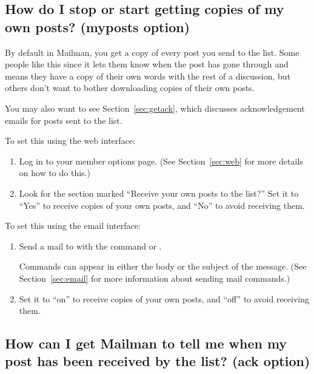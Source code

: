 \documentclass{howto}
\begin{document}
\subsection{How do I stop or start getting copies of my own posts? (myposts
	option)\label{sec:getown}}
By default in Mailman, you get a copy of every post you send to the list.  
Some people like this since it lets them know when the post has gone through
and means they have a copy of their own words with the rest of a discussion, 
but others don't want to bother downloading copies of their own posts.


You may also want to see Section~\ref{sec:getack}, which discusses 
acknowledgement emails for posts sent to the list.

To set this using the web interface:
\begin{enumerate}
	\item Log in to your member options page.  (See Section~\ref{sec:web} 
	for more details on how to do this.)
	\item Look for the section marked ``Receive your own posts to the list?''  
	Set it to ``Yes'' to receive copies of your own posts, and  ``No'' to avoid
	receiving them.
\end{enumerate}

To set this using the email interface:
\begin{enumerate}
   \item Send a mail to  with the command
    or .

   Commands can appear
   in either the body or the subject of the message.  (See
   Section~\ref{sec:email} for more information about sending mail
   commands.)
	\item Set it to ``on'' to receive copies of your own posts, and ``off''
	to avoid receiving them.
\end{enumerate}


\subsection{How can I get Mailman to tell me when my post has been received
by the list? (ack option)\label{sec:getack}}
\end{document}
